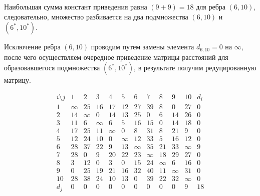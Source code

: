 \documentclass{article}
\begin{document}
Наибольшая сумма констант приведения равна $(9 + 9) = 18$ для ребра $(6,10)$, следовательно, множество разбивается на два подмножества $(6,10)$ и $(6^*,10^*)$.


Исключение ребра $(6,10)$ проводим путем замены элемента $d_{6,10} = 0$ на $\infty$, после чего осуществляем очередное приведение матрицы расстояний для образовавшегося подмножества $(6^*,10^*)$, в результате получим редуцированную матрицу.

\[
    \begin{array}{c|cccccccccc|c}
        i \setminus j & 1      & 2      & 3      & 4      & 5      & 6      & 7      & 8      & 9      & 10     & d_i \\
        \hline
        1             & \infty & 25     & 16     & 17     & 12     & 27     & 39     & 8      & 0      & 27     & 0   \\
        2             & 14     & \infty & 0      & 14     & 13     & 25     & 0      & 6      & 14     & 26     & 0   \\
        3             & 11     & 6      & \infty & 6      & 5      & 16     & 15     & 0      & 14     & 18     & 0   \\
        4             & 17     & 25     & 11     & \infty & 0      & 8      & 31     & 8      & 21     & 9      & 0   \\
        5             & 12     & 24     & 10     & 0      & \infty & 12     & 33     & 5      & 16     & 12     & 0   \\
        6             & 28     & 37     & 22     & 9      & 13     & \infty & 35     & 21     & 33     & \infty & 9   \\
        7             & 28     & 0      & 9      & 20     & 22     & 23     & \infty & 18     & 29     & 27     & 0   \\
        8             & 3      & 12     & 0      & 3      & 0      & 15     & 24     & \infty & 6      & 16     & 0   \\
        9             & 0      & 25     & 19     & 21     & 16     & 32     & 40     & 11     & \infty & 31     & 0   \\
        10            & 28     & 38     & 24     & 10     & 13     & 0      & 39     & 22     & 32     & \infty & 0   \\
        \hline
        d_j           & 0      & 0      & 0      & 0      & 0      & 0      & 0      & 0      & 0      & 9      & 18  \\
    \end{array}
\]
\end{document}
